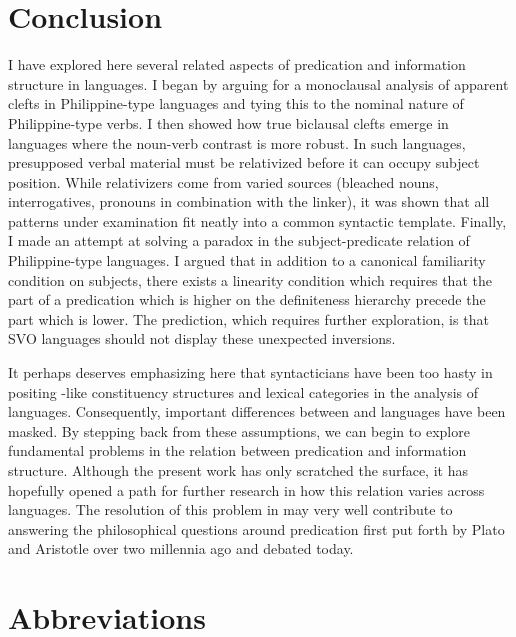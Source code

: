 \documentclass[output=paper]{langsci/langscibook}
\begin{document}
\section{Conclusion}

I have explored here several related aspects of predication and information structure in  languages. I began by arguing for a monoclausal analysis of apparent clefts in Philippine-type languages and tying this to the nominal nature of Philippine-type verbs. I then showed how true biclausal clefts emerge in  languages where the noun-verb contrast is more robust. In such languages, presupposed verbal material must be relativized before it can occupy subject position. While  relativizers come from varied sources (bleached nouns, interrogatives, pronouns in combination with the linker), it was shown that all patterns under examination fit neatly into a common syntactic template. Finally, I made an attempt at solving a paradox in the subject-predicate relation of Philippine-type languages. I argued that in addition to a canonical familiarity condition on subjects, there exists a linearity condition which requires that the part of a predication which is higher on the definiteness hierarchy precede the part which is lower. The prediction, which requires further exploration, is that SVO languages should not display these unexpected inversions.

It perhaps deserves emphasizing here that syntacticians have been too hasty in positing -like constituency structures and lexical categories in the analysis of  languages. Consequently, important differences between  and   languages have been masked. By stepping back from these assumptions, we can begin to explore fundamental problems in the relation between predication and information structure. Although the present work has only scratched the surface, it has hopefully opened a path for further research in how this relation varies across  languages. The resolution of this problem in  may very well contribute to answering the philosophical questions around predication first put forth by Plato and Aristotle over two millennia ago and debated today.

\section*{Abbreviations}
\end{document}
